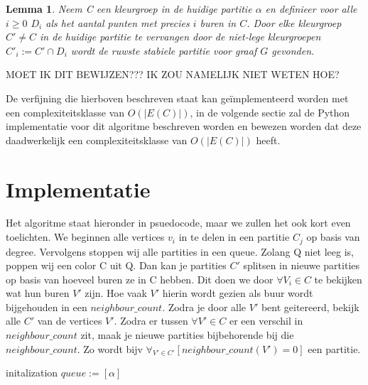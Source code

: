 \documentclass[twoside]{article}
\newtheorem{lemma}[theorem]{Lemma}
\begin{document}
\begin{multicols}{2}
\begin{lemma}
Neem C een kleurgroep in de huidige partitie $\alpha$ en definieer voor alle $i \geq 0$ $D_{i}$ als het aantal punten met precies $i$ buren in $C$. Door elke kleurgroep $C' \neq C$ in de huidige partitie te vervangen door de niet-lege kleurgroepen $C'_{i} := C'\cap D_{i}$ wordt de ruwste stabiele partitie voor graaf $G$ gevonden.
\end{lemma}

MOET IK DIT BEWIJZEN??? IK ZOU NAMELIJK NIET WETEN HOE?

De verfijning die hierboven beschreven staat kan ge\"implementeerd worden met een complexiteitsklasse van $O(|E(C)|)$, in de volgende sectie zal de Python implementatie voor dit algoritme beschreven worden en bewezen worden dat deze daadwerkelijk een complexiteitsklasse van $O(|E(C)|)$ heeft.

\section{Implementatie}
Het algoritme staat hieronder in psuedocode, maar we zullen het ook kort even toelichten. We beginnen alle vertices $v_i$ in te delen in een partitie $C_j$ op basis van degree. Vervolgens stoppen wij alle partities in een queue.
Zolang Q niet leeg is, poppen wij een color C uit Q. 
Dan kan je partities $ C' $ splitsen in nieuwe partities op basis van hoeveel buren ze in C hebben. Dit doen we door $ \forall V_i \in C $ te bekijken wat hun buren $V'$ zijn. Hoe vaak $V'$ hierin wordt  gezien als buur wordt bijgehouden in een $neighbour\_count$. Zodra je door alle $V'$ bent geitereerd, bekijk alle $C'$ van de vertices $V'$. Zodra er tussen $ \forall{V'} \in C $ er een verschil in $neighbour\_count$ zit, maak je nieuwe partities bijbehorende bij die $neighbour\_count$. Zo wordt bijv $ \forall_{V' \in C'}  [ neighbour\_count(V') = 0] $ een partitie.

\begin{algorithm}[H]
initalization \;
 $queue := [\alpha]$\;
\end{algorithm}
\end{multicols}
\end{document}
